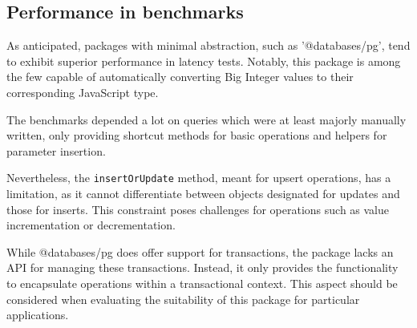 \subsection{Performance in benchmarks}
As anticipated, packages with minimal abstraction, such as '@databases/pg', tend
to exhibit superior performance in latency tests. Notably, this package is among
the few capable of automatically converting Big Integer values to their
corresponding JavaScript type.

The benchmarks depended a lot on queries which were at least majorly manually
written, only providing shortcut methods for basic operations and helpers for
parameter insertion.

Nevertheless, the \texttt{insertOrUpdate} method, meant for upsert operations, has a
limitation, as it cannot differentiate between objects designated for updates
and those for inserts. This constraint poses challenges for operations such as
value incrementation or decrementation.

While @databases/pg does offer support for transactions, the package lacks an
API for managing these transactions. Instead, it only provides the functionality
to encapsulate operations within a transactional context. This aspect should be
considered when evaluating the suitability of this package for particular
applications.
